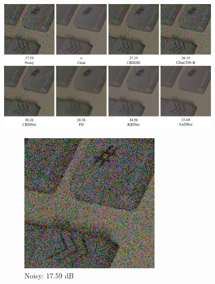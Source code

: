 \begin{figure}[t!]
    \centering
    \includegraphics[width=0.96\textwidth]{images/tus.png}
    \begin{subfigure}{0.28\textwidth}
        \includegraphics[width=\linewidth]{images/tus_noisy.png}
        \caption{Noisy: 17.59 dB}
        \label{fig:tus_noisy}
    \end{subfigure}\hfil %
    \begin{subfigure}{0.28\textwidth}

\end{subfigure}
\end{figure}
